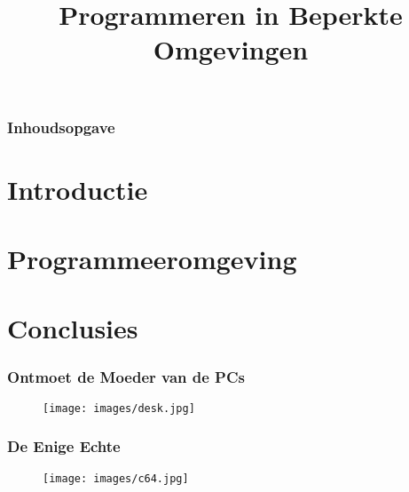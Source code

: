 \documentclass[aspectratio=43]{uva-inf-presentation}
\title{Programmeren in Beperkte Omgevingen}
\begin{document}
\begin{titelframe}
\titlepage

\end{titelframe}

\begin{frame}
\frametitle{Inhoudsopgave}
\tableofcontents
\end{frame}


\section{Introductie}
\section{Programmeeromgeving}

\section{Conclusies}


\begin{frame}
\frametitle{Ontmoet de Moeder van de PCs}

\begin{figure}
\texttt{[image: images/desk.jpg]}
\end{figure}

\end{frame}


\begin{frame}
\frametitle{De Enige Echte}

\begin{figure}
\texttt{[image: images/c64.jpg]}
\end{figure}

\end{frame}

\end{document}
